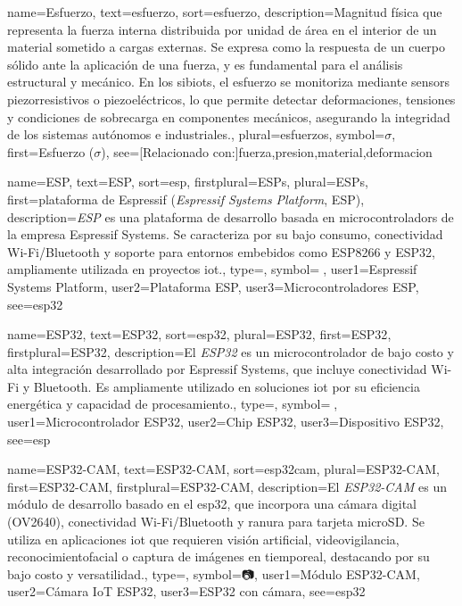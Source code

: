 	{
		name={Esfuerzo},
		text={esfuerzo},
		sort={esfuerzo},
		description={Magnitud f{\'i}sica que representa la fuerza interna distribuida por unidad de {\'a}rea en el interior de un material sometido a cargas externas. 
			Se expresa como la respuesta de un cuerpo s{\'o}lido ante la aplicaci{\'o}n de una fuerza, y es fundamental para el an{\'a}lisis estructural y mec{\'a}nico. 
			En los \glspl{sibiot}, el esfuerzo se monitoriza mediante \glspl{sensor} piezorresistivos o piezoel{\'e}ctricos, lo que permite detectar deformaciones, tensiones y condiciones de sobrecarga en componentes mec{\'a}nicos, asegurando la integridad de los sistemas aut{\'o}nomos e industriales.},
		plural={esfuerzos},
		symbol={\ensuremath{\sigma}},
		first={Esfuerzo (\ensuremath{\sigma})},
		see=[Relacionado con:]{fuerza,presion,material,deformacion}
	}
	
	{
		name={ESP},
		text={ESP},
		sort={esp},
		firstplural={ESPs},
		plural={ESPs},
		first={plataforma de Espressif (\textit{Espressif Systems Platform}, ESP)},
		description={\emph{ESP} es una plataforma de desarrollo basada en \glspl{microcontrolador} de la empresa Espressif Systems. Se caracteriza por su bajo consumo, conectividad Wi-Fi/Bluetooth y soporte para entornos embebidos como ESP8266 y ESP32, ampliamente utilizada en proyectos \gls{iot}.},
		type=\glsdefaulttype,
		symbol={📡},
		user1={Espressif Systems Platform},
		user2={Plataforma ESP},
		user3={Microcontroladores ESP},
		see={esp32}
	}
	
	{
		name={ESP32},
		text={ESP32},
		sort={esp32},
		plural={ESP32},
		first={ESP32},
		firstplural={ESP32},
		description={El \emph{ESP32} es un \gls{microcontrolador} de bajo costo y alta integraci{\'o}n desarrollado por Espressif Systems, que incluye conectividad Wi-Fi y Bluetooth. Es ampliamente utilizado en soluciones \gls{iot} por su eficiencia energ{\'e}tica y capacidad de procesamiento.},
		type=\glsdefaulttype,
		symbol={📶},
		user1={Microcontrolador ESP32},
		user2={Chip ESP32},
		user3={Dispositivo ESP32},
		see={esp}
	}
	
	{
		name={ESP32-CAM},
		text={ESP32-CAM},
		sort={esp32cam},
		plural={ESP32-CAM},
		first={ESP32-CAM},
		firstplural={ESP32-CAM},
		description={El \emph{ESP32-CAM} es un m{\'o}dulo de desarrollo basado en el \gls{esp32}, que incorpora una c{\'a}mara digital (OV2640), conectividad Wi-Fi/Bluetooth y ranura para tarjeta microSD. Se utiliza en aplicaciones \gls{iot} que requieren visi{\'o}n artificial, videovigilancia, \gls{reconocimientofacial} o captura de im{\'a}genes en \gls{tiemporeal}, destacando por su bajo costo y versatilidad.},
		type=\glsdefaulttype,
		symbol={📷},
		user1={M{\'o}dulo ESP32-CAM},
		user2={C{\'a}mara IoT ESP32},
		user3={ESP32 con c{\'a}mara},
		see={esp32}
	}
	
